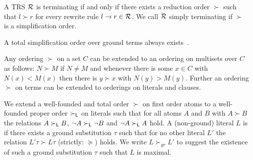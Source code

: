 \begin{theorem}
	A TRS \( \mathcal{R} \) is terminating if and only if there exists a reduction order \( \succ \)
	such that \( l\succ r \) for every rewrite rule \( l\rightarrow r\in\mathcal{R} \).
	We call \( \mathcal{R} \) simply terminating if \( \succ \) is a simplification order.
\end{theorem}


\begin{lemma}
    A total simplification order
    over ground terms always exists~\cite{NR2001}.
\end{lemma}


\begin{lemma}
	Any ordering \( \succ \) on a set \( C \) can be extended to an ordering on multisets over \( C \)
	as follows:
	\( N \succ M \) if \( N \neq M \)
	and whenever there is some \( x\in C \) with \( N(x) < M(x) \)
	then there is \( y \succ x \) with \( N(y) > M(y) \).
	Further an ordering \( \succ \) on terms can be extended to orderings on literals and clauses.
\end{lemma}






	\begin{definition}\label{def:orders-on-literals}
		We extend a well-founded and total order \( \succ \) on first order atoms to a well-founded proper order \( \succ_{\mathsf{L}} \)
		on literals such that for all atoms \( A \) and \( B \) with \( A\succ B \)
		the relations \( A\succ_{\mathsf{L}} B \),
		\( \lnot A\succ_{\mathsf{L}}\lnot B \) and
		\( \lnot A\succ_{\mathsf{L}} A \) hold.
		A (non-ground) literal \( L \) is  if there exists a ground substitution \( \tau \)
		such that for no other literal \( L' \) the relation \( L'\tau\succ L\tau \) (strictly: \( \succcurlyeq \)) holds.
		We write \( L \succ_{gr} L' \) to suggest the existence of such a ground substitution \( \tau \) such that \( L \) is maximal.
	\end{definition}



%





